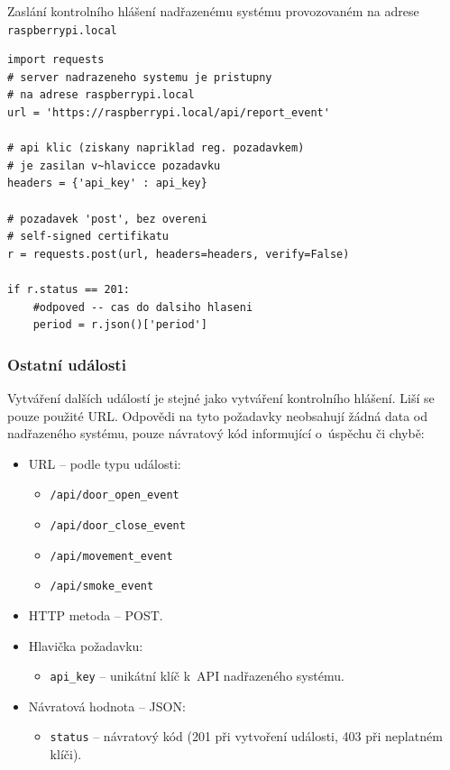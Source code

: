 \begin{listing}[htbp]
\caption{\label{lst:api_report} Zaslání kontrolního hlášení nadřazenému systému provozovaném na adrese \texttt{raspberrypi.local}}
\begin{verbatim}
import requests
# server nadrazeneho systemu je pristupny
# na adrese raspberrypi.local
url = 'https://raspberrypi.local/api/report_event'

# api klic (ziskany napriklad reg. pozadavkem)
# je zasilan v~hlavicce pozadavku
headers = {'api_key' : api_key}

# pozadavek 'post', bez overeni
# self-signed certifikatu
r = requests.post(url, headers=headers, verify=False)

if r.status == 201:
    #odpoved -- cas do dalsiho hlaseni
    period = r.json()['period']

\end{verbatim}
\end{listing}

\subsubsection{Ostatní události}

Vytváření dalších událostí je stejné jako vytváření kontrolního hlášení. Liší se pouze použité URL. Odpovědi na tyto požadavky neobsahují žádná data od nadřazeného systému, pouze návratový kód informující o~úspěchu či chybě:

\begin{itemize}
    \item URL -- podle typu události:
    \begin{itemize}
        \item \texttt{/api/door\_open\_event}
        \item \texttt{/api/door\_close\_event}
        \item \texttt{/api/movement\_event}
        \item \texttt{/api/smoke\_event}
    \end{itemize}
    \item HTTP metoda -- POST.
    \item Hlavička požadavku:
    \begin{itemize}
        \item \texttt{api\_key} -- unikátní klíč k~API nadřazeného systému.
    \end{itemize}
    \item Návratová hodnota -- JSON:
    \begin{itemize}
        \item \texttt{status} -- návratový kód (201 při vytvoření události, 403 při neplatném klíči).
    \end{itemize}
\end{itemize}

